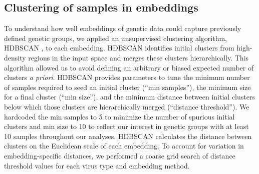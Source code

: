 \documentclass[10pt,letterpaper]{article}
\begin{document}
\subsection*{Clustering of samples in embeddings}

To understand how well embeddings of genetic data could capture previously defined genetic groups, we applied an unsupervised clustering algorithm, HDBSCAN \cite{campello2015hierarchical}, to each embedding.
HDBSCAN identifies initial clusters from high-density regions in the input space and merges these clusters hierarchically.
This algorithm allowed us to avoid defining an arbitrary or biased expected number of clusters \emph{a priori}.
HDBSCAN provides parameters to tune the minimum number of samples required to seed an initial cluster (``min samples''), the minimum size for a final cluster (``min size''), and the minimum distance between initial clusters below which those clusters are hierarchically merged (``distance threshold'').
We hardcoded the min samples to 5 to minimize the number of spurious initial clusters and min size to 10 to reflect our interest in genetic groups with at least 10 samples throughout our analyses.
HDBSCAN calculates the distance between clusters on the Euclidean scale of each embedding.
To account for variation in embedding-specific distances, we performed a coarse grid search of distance threshold values for each virus type and embedding method.
\end{document}
